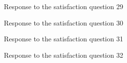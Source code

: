 \documentclass[12pt,oneside,openright,a4paper]{cpe-english-project}
\begin{document}
\begin{figure}[!h]\centering {} \caption{Response to the satisfaction question 29} \end{figure}
\begin{figure}[!h]\centering {} \caption{Response to the satisfaction question 30} \end{figure}
\begin{figure}[!h]\centering {} \caption{Response to the satisfaction question 31} \end{figure}
\begin{figure}[!h]\centering {} \caption{Response to the satisfaction question 32} \end{figure}
\end{document}
